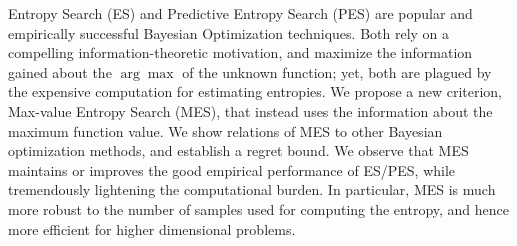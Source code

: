Entropy Search (ES) and Predictive Entropy Search (PES) are popular and empirically successful Bayesian Optimization techniques. Both rely on a compelling information-theoretic motivation, and maximize the information gained about the $\arg\max$ of the unknown function; yet, both are plagued by the expensive computation  for estimating entropies. We propose a new criterion, Max-value Entropy Search (MES), that instead uses the information about the maximum function value. We show relations of MES to other Bayesian optimization methods, and establish a regret bound. We observe that MES maintains or improves the good empirical performance of ES/PES, while tremendously lightening the computational burden. In particular, MES is much more robust to the number of samples used for computing the entropy, and hence more efficient for higher dimensional problems. %
